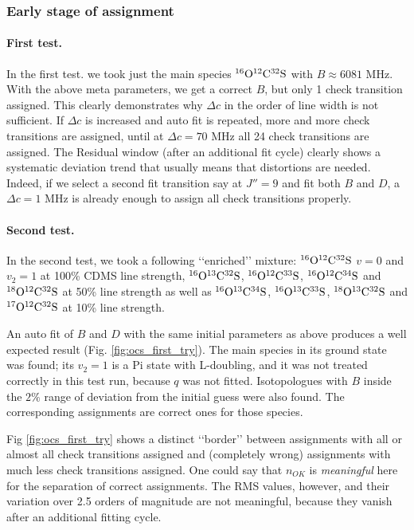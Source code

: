 \documentclass[11pt]{article}
\begin{document}
\subsubsection{Early stage of assignment}

\paragraph{First test.} 
In the first test. we took just the main species $\rm ^{16}O^{12}C^{32}S$ with $B \approx 6081$ MHz. With the above meta parameters, we get a correct $B$, but only 1 check transition assigned. This clearly demonstrates why $\Delta c$ in the order of line width is not sufficient. If $\Delta c$ is increased and auto fit is repeated, more and more check transitions are assigned, until at $\Delta c = 70$ MHz all 24 check transitions are assigned. The Residual window (after an additional fit cycle) clearly shows a systematic deviation trend that usually means that distortions are needed. Indeed, if we select a second fit transition say at $J'' = 9$ and fit both $B$ and $D$, a $\Delta c = 1$ MHz is already enough to assign all check transitions properly.

\paragraph{Second test.}
In the second test, we took a following \lq\lq{}enriched\rq\rq{} mixture: $\rm ^{16}O^{12}C^{32}S$ $v = 0$ and $v_2 = 1$ at 100\% CDMS line strength, 
$\rm ^{16}O^{13}C^{32}S$, $\rm ^{16}O^{12}C^{33}S$, $\rm ^{16}O^{12}C^{34}S$ and $\rm ^{18}O^{12}C^{32}S$ at 50\% line strength as well as $\rm ^{16}O^{13}C^{34}S$, $\rm ^{16}O^{13}C^{33}S$, $\rm ^{18}O^{13}C^{32}S$ and $\rm ^{17}O^{12}C^{32}S$ at 10\% line strength. 

An auto fit of $B$ and $D$ with the same initial parameters as above produces a well expected result (Fig. \ref{fig:ocs_first_try}). The main species in its ground state was found; its $v_2 = 1$ is a Pi state with L-doubling, and it was not treated correctly in this test run, because $q$ was not fitted. Isotopologues with $B$ inside the $2\%$ range of deviation from the initial guess were also found. The corresponding assignments are correct ones for those species.

Fig \ref{fig:ocs_first_try} shows a distinct \lq\lq{}border\rq\rq{} between assignments with all or almost all check transitions assigned and (completely wrong) assignments with much less check transitions assigned. One could say that $n_{OK}$ is \emph{meaningful} here for the separation of correct assignments. The RMS values, however, and their variation over 2.5 orders of magnitude are not meaningful, because they vanish after an additional fitting cycle. 
\end{document}
